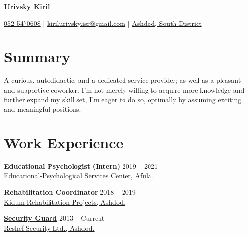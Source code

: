 \documentclass[
	12pt,a4paper %
]{article}
\begin{document}
\begin{center}
				{\Huge{\textbf{Urivsky Kiril}}}

\vspace{2pt}
\colorbox{shade}{ %
\raisebox{-1pt}{\faPhone} \href{tel:972525470608}{052-5470608} | \raisebox{0pt}{\small\faEnvelope} \href{mailto:kirilurivsky.isr@gmail.com}{kirilurivsky.isr@gmail.com} | \raisebox{0pt}{\faHome} \href{https://goo.gl/maps/MSacjpSy7vZSKykP7}{Ashdod, South District}
}
\end{center}

\section{Summary}
A curious, autodidactic, and a dedicated service provider; as well as a pleasant and supportive coworker. I'm not merely willing to acquire more knowledge and further expand my skill set, I'm eager to do so, optimally by assuming exciting and meaningful positions.

\section{Work Experience}

\textbf{\large Educational Psychologist} \textbf{(Intern)} \hfill 2019 -- 2021 \\
{Educational-Psychological Services Center, Afula.} 

\noindent\dotfill %

\noindent\textbf{\large Rehabilitation Coordinator} \hfill 2018 -- 2019 \\
\href{http://www.kidumpro.co.il/}{Kidum Rehabilitation Projects, Ashdod.}

\noindent\dotfill %

\noindent\href{https://loona-il.000webhostapp.com/resume-references/recommendation-letter-security-guard.jpg}{\large \textbf{Security Guard}} \hfill 2013 -- Current \\
\href{https://loona-il.000webhostapp.com/resume-references/recommendation-letter-security-guard.jpg}{Reshef Security Ltd., Ashdod.}
\end{document}
